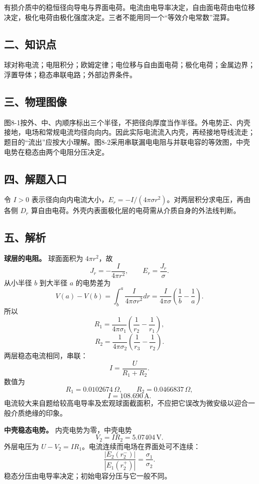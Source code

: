 \documentclass[12pt,a4paper,UTF8]{ctexart}
\begin{document}
有损介质中的稳恒径向导电与界面电荷。电流由电导率决定，自由面电荷由电位移决定，极化电荷由极化强度决定。三者不能用同一个``等效介电常数''混算。

\subsection{二、知识点}\label{ux4e8cux77e5ux8bc6ux70b9-7}

球对称电流；电阻积分；欧姆定律；电位移与自由面电荷；极化电荷；金属边界；浮置导体；稳态串联电路；外部边界条件。

\subsection{三、物理图像}\label{ux4e09ux7269ux7406ux56feux50cf-7}

图8-1按外、中、内顺序标出三个半径，不把径向厚度当作半径。外电势正、内壳接地，电场和常规电流均径向向内。因此实际电流流入内壳，再经接地导线流走；题目的``流出''应按大小理解。图8-2采用串联漏电电阻与并联电容的等效图，中壳电势在稳态由两个电阻分压决定。

\subsection{四、解题入口}\label{ux56dbux89e3ux9898ux5165ux53e3-7}

令 \(I>0\)
表示径向向内电流大小，\(E_r=-I/(4\pi\sigma r^2)\)。对两层积分求电压，再由各侧
\(D_r\) 算自由电荷。外壳内表面极化层的电荷需从介质自身的外法线判断。

\subsection{五、解析}\label{ux4e94ux89e3ux6790-7}

\textbf{球层的电阻。} 球面面积为 \(4\pi r^2\)，故 \[
J_r=-\frac I{4\pi r^2},\qquad
E_r=\frac{J_r}{\sigma}.
\] 从小半径 \(b\) 到大半径 \(a\) 的电势差为 \[
V(a)-V(b)=\int_b^a\frac I{4\pi\sigma r^2}dr
=\frac I{4\pi\sigma}\left(\frac1b-\frac1a\right).
\] 所以 \[
R_1=\frac1{4\pi\sigma_1}
\left(\frac1{r_2}-\frac1{r_1}\right),
\] \[
R_2=\frac1{4\pi\sigma_2}
\left(\frac1{r_3}-\frac1{r_2}\right).
\] 两层稳态电流相同，串联： \[
\boxed{I=\frac U{R_1+R_2}}.
\] 数值为 \[
R_1=0.0102674\,\Omega,\qquad
R_2=0.0466837\,\Omega,
\] \[
\boxed{I=108.690\,\mathrm A}.
\]
电流较大来自题给较高电导率及宏观球面截面积，不应把它误改为微安级以迎合一般介质绝缘的印象。

\textbf{中壳稳态电势。} 内壳电势为零，中壳电势 \[
\boxed{V_2=IR_2=5.07404\,\mathrm V}.
\] 外层电压为 \(U-V_2=IR_1\)。电流连续而电场在界面处可不连续： \[
\frac{|E_2(r_2^-)|}{|E_1(r_2^+)|}
=\frac{\sigma_1}{\sigma_2}.
\] 稳态分压由电导率决定；初始电容分压与它一般不同。
\end{document}
